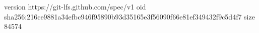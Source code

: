 version https://git-lfs.github.com/spec/v1
oid sha256:216ce9881a34efbc946f95890b93d35165e3f56090f66e81ef349432f9c5d4f7
size 84574
